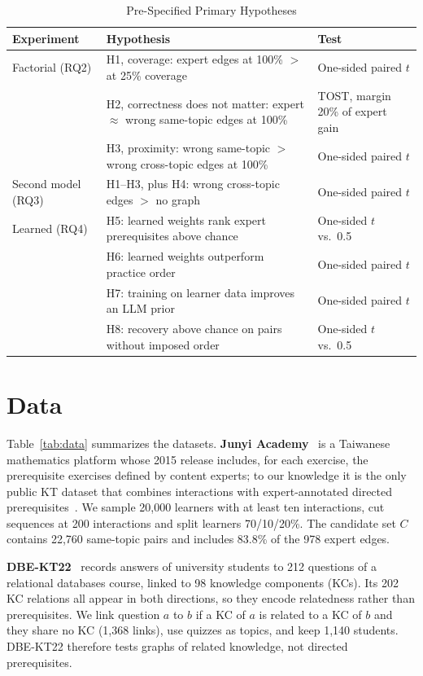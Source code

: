 \documentclass[lettersize,journal]{IEEEtran}
\begin{document}
\begin{table}[t]
\centering
\caption{Pre-Specified Primary Hypotheses}
\label{tab:hyp}
\footnotesize
\setlength{\tabcolsep}{3pt}
\begin{tabular}{@{}p{1.5cm}p{4.45cm}p{1.45cm}@{}}
\toprule
Experiment & Hypothesis & Test \\
\midrule
Factorial (RQ2) & H1, coverage: expert edges at 100\% $>$ at 25\% coverage & One-sided paired $t$ \\
 & H2, correctness does not matter: expert $\approx$ wrong same-topic edges at 100\% & TOST, margin 20\% of expert gain \\
 & H3, proximity: wrong same-topic $>$ wrong cross-topic edges at 100\% & One-sided paired $t$ \\
Second model (RQ3) & H1--H3, plus H4: wrong cross-topic edges $>$ no graph & One-sided paired $t$ \\
Learned (RQ4) & H5: learned weights rank expert prerequisites above chance & One-sided $t$ vs.\ 0.5 \\
 & H6: learned weights outperform practice order & One-sided paired $t$ \\
 & H7: training on learner data improves an LLM prior & One-sided paired $t$ \\
 & H8: recovery above chance on pairs without imposed order & One-sided $t$ vs.\ 0.5 \\
\bottomrule
\end{tabular}
\end{table}

\section{Data}
Table~\ref{tab:data} summarizes the datasets. \textbf{Junyi Academy}~\cite{chang2015modeling} is a Taiwanese mathematics platform whose 2015 release includes, for each exercise, the prerequisite exercises defined by content experts; to our knowledge it is the only public KT dataset that combines interactions with expert-annotated directed prerequisites~\cite{zhou2024predictive}. We sample 20{,}000 learners with at least ten interactions, cut sequences at 200 interactions and split learners 70/10/20\%. The candidate set $C$ contains 22{,}760 same-topic pairs and includes 83.8\% of the 978 expert edges.

\textbf{DBE-KT22}~\cite{abdelrahman2022dbe} records answers of university students to 212 questions of a relational databases course, linked to 98 knowledge components (KCs). Its 202 KC relations all appear in both directions, so they encode relatedness rather than prerequisites. We link question $a$ to $b$ if a KC of $a$ is related to a KC of $b$ and they share no KC (1{,}368 links), use quizzes as topics, and keep 1{,}140 students. DBE-KT22 therefore tests graphs of related knowledge, not directed prerequisites.
\end{document}
